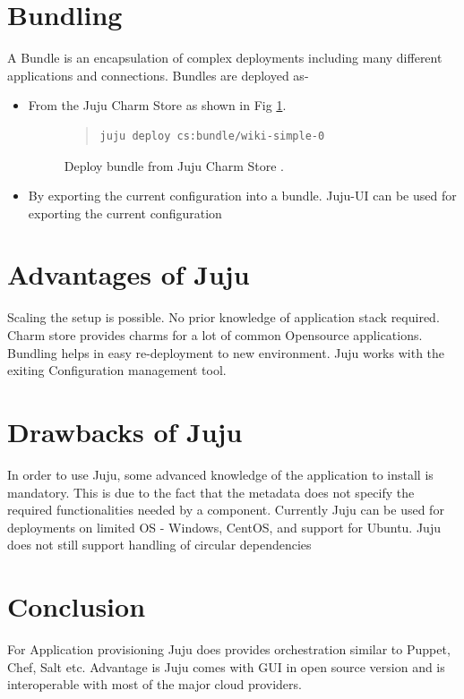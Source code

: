 \documentclass[9pt,twocolumn,twoside]{../../styles/osajnl}
\begin{document}
\section{Bundling}
A Bundle is an encapsulation of complex deployments including many
different applications and connections.
Bundles are deployed as-
\begin{itemize}
\item[1.] From the Juju Charm Store as shown in Fig
  \ref{fig:deploybundle-status}.
\begin{figure}
  \caption{Deploy bundle from Juju Charm Store
    \cite{www-jujucharm-documentation}.}
  \label{fig:deploybundle-status}
  \begin{quote}
    \begin{Verbatim}
juju deploy cs:bundle/wiki-simple-0
    \end{Verbatim}
  \end{quote}
\end{figure}
    
\item[2.] By exporting the current configuration into a
  bundle. Juju-UI can be used for exporting the current configuration
\end{itemize}

\section{Advantages of Juju}

Scaling the setup is possible. No prior knowledge of application stack
required. Charm store provides charms for a lot of common Opensource
applications. Bundling helps in easy re-deployment to new environment.
Juju works with the exiting Configuration management tool.

\section{Drawbacks of Juju}

In order to use Juju, some advanced knowledge of the application to
install is mandatory. This is due to the fact that the metadata does
not specify the required functionalities needed by a component.
Currently Juju can be used for deployments on limited OS - Windows,
CentOS, and support for Ubuntu. Juju does not still support handling
of circular dependencies


\section{Conclusion}
For Application provisioning Juju does provides orchestration similar
to Puppet, Chef, Salt etc. Advantage is Juju comes with GUI in open
source version and is interoperable with most of the major cloud
providers.


 
\end{document}
